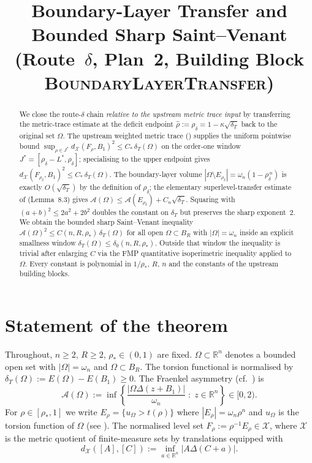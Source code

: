 \documentclass[11pt]{article}
\title{Boundary-Layer Transfer and Bounded Sharp Saint--Venant\\
       (Route~$\delta$, Plan~2, Building Block \textsc{BoundaryLayerTransfer})}
\author{}
\date{}
\theoremstyle{definition}
\newcommand{\R}{\mathbb{R}}
\newcommand{\Fr}{\mathcal{A}}
\newcommand{\Om}{\Omega}
\newcommand{\rstar}{\rho_{*}}
\newcommand{\rhad}{\widehat\rho}
\newcommand{\X}{\mathcal X}
\begin{document}
\maketitle

\begin{abstract}
We close the route-$\delta$ chain \emph{relative to the upstream metric
trace input} by transferring the metric-trace estimate at the deficit
endpoint $\rhad:=\rho_\delta=1-\kappa\sqrt{\delta_T}$ back to the
original set $\Om$.
The upstream weighted metric trace (\cite{WeightedMetricTrace}) supplies
the uniform pointwise bound
$\sup_{\rho\in J^*}d_{\X}(F_\rho,B_1)^2\le C_*\,\delta_T(\Om)$ on the
order-one window $J^*=[\rho_\delta-L^*,\rho_\delta]$; specialising to
the upper endpoint gives $d_{\X}(F_{\rho_\delta},B_1)^2\le C_*\,\delta_T(\Om)$.
The boundary-layer volume
$|\Om\setminus E_{\rho_\delta}|=\omega_n(1-\rho_\delta^{\,n})$ is exactly
$O(\sqrt{\delta_T})$ by the definition of $\rho_\delta$; the elementary
superlevel-transfer estimate of \cite{LevelSetIdentity} (Lemma~8.3)
gives $\Fr(\Om)\le \Fr(E_{\rho_\delta})+C_n\sqrt{\delta_T}$. Squaring
with $(a+b)^2\le 2a^2+2b^2$ doubles the constant on $\delta_T$ but
preserves the sharp exponent~$2$. We obtain the bounded sharp
Saint--Venant inequality
$\Fr(\Om)^2\le C(n,R,\rstar)\,\delta_T(\Om)$ for all open
$\Om\subset B_R$ with $|\Om|=\omega_n$ inside an explicit smallness
window $\delta_T(\Om)\le \delta_0(n,R,\rstar)$. Outside that window
the inequality is trivial after enlarging $C$ via the FMP
quantitative isoperimetric inequality applied to $\Om$. Every
constant is polynomial in $1/\rstar$, $R$, $n$ and the constants of
the upstream building blocks.
\end{abstract}

\section{Statement of the theorem}\label{sec:statement}

Throughout, $n\ge 2$, $R\ge 2$, $\rstar\in(0,1)$ are fixed.
$\Om\subset\R^n$ denotes a bounded open set with $|\Om|=\omega_n$ and
$\Om\subset B_R$. The torsion functional is normalised by
$\delta_T(\Om):=E(\Om)-E(B_1)\ge 0$.
The Fraenkel asymmetry (cf.\ \cite{AFP2000}) is
\[
\Fr(\Om):=\inf\!\left\{\frac{|\Om\Delta(z+B_1)|}{\omega_n}\;:\;z\in\R^n\right\}\in[0,2).
\]
For $\rho\in[\rstar,1]$ we write $E_\rho=\{u_\Om>t(\rho)\}$ where
$|E_\rho|=\omega_n\rho^n$ and $u_\Om$ is the torsion function of $\Om$
(see \cite{LevelSetIdentity}). The normalised level set
$F_\rho:=\rho^{-1}E_\rho\in\X$, where $\X$ is the metric quotient of
finite-measure sets by translations equipped with
\[
d_{\X}([A],[C]):=\inf_{a\in\R^n}|A\Delta(C+a)|.
\]
\end{document}
